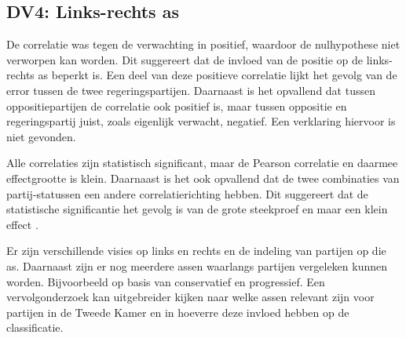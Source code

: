\subsection{DV4: Links-rechts as}
De correlatie was tegen de verwachting in positief, waardoor de nulhypothese niet verworpen kan worden. Dit suggereert dat de invloed van de positie op de links-rechts as beperkt is.  Een deel van deze positieve correlatie lijkt het gevolg van de error tussen de twee regeringspartijen. Daarnaast is het opvallend dat tussen oppositiepartijen de correlatie ook positief is, maar tussen oppositie en regeringspartij juist, zoals eigenlijk verwacht, negatief. Een verklaring hiervoor is niet gevonden. \par
Alle correlaties zijn statistisch significant, maar de Pearson correlatie en daarmee effectgrootte is klein. Daarnaast is het ook opvallend dat de twee combinaties van partij-statussen een andere correlatierichting hebben. Dit suggereert dat de statistische significantie het gevolg is van de grote steekproef en maar een klein effect \cite{Hair}.\par
Er zijn verschillende visies op links en rechts en de indeling van partijen op die as. Daarnaast zijn er nog meerdere assen waarlangs partijen vergeleken kunnen worden. Bijvoorbeeld op basis van conservatief en progressief. Een vervolgonderzoek kan uitgebreider kijken naar welke assen relevant zijn voor partijen in de Tweede Kamer en in hoeverre deze invloed hebben op de classificatie. \par

